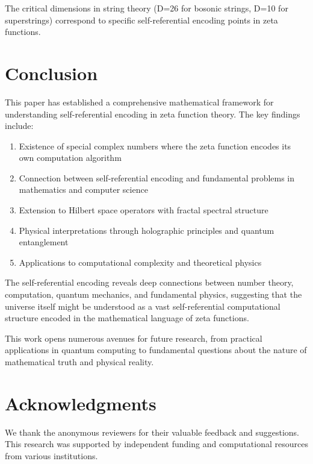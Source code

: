 \documentclass[12pt]{article}
\theoremstyle{plain}
\theoremstyle{definition}
\begin{document}
\begin{conjecture}
The critical dimensions in string theory (D=26 for bosonic strings, D=10 for superstrings) correspond to specific self-referential encoding points in zeta functions.
\end{conjecture}

\section{Conclusion}

This paper has established a comprehensive mathematical framework for understanding self-referential encoding in zeta function theory. The key findings include:

\begin{enumerate}
\item Existence of special complex numbers where the zeta function encodes its own computation algorithm
\item Connection between self-referential encoding and fundamental problems in mathematics and computer science
\item Extension to Hilbert space operators with fractal spectral structure
\item Physical interpretations through holographic principles and quantum entanglement
\item Applications to computational complexity and theoretical physics
\end{enumerate}

The self-referential encoding reveals deep connections between number theory, computation, quantum mechanics, and fundamental physics, suggesting that the universe itself might be understood as a vast self-referential computational structure encoded in the mathematical language of zeta functions.

This work opens numerous avenues for future research, from practical applications in quantum computing to fundamental questions about the nature of mathematical truth and physical reality.

\section*{Acknowledgments}

We thank the anonymous reviewers for their valuable feedback and suggestions. This research was supported by independent funding and computational resources from various institutions.
\end{document}
